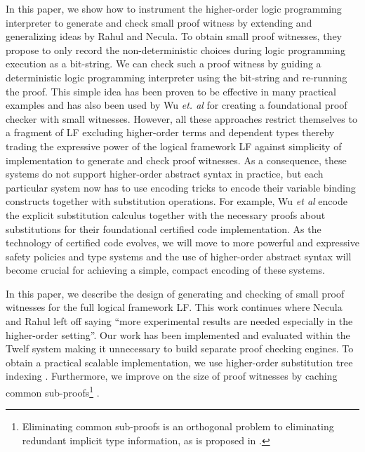 \documentclass{llncs}
\begin{document}
In this paper, we show how to instrument the higher-order logic
programming interpreter to generate and check small proof
witness by extending and generalizing ideas by Rahul and
Necula\cite{Necula+01:oracle}. To obtain small proof witnesses, they
propose to only record the non-deterministic choices during 
logic programming execution as a bit-string. We can check such a proof
witness by guiding a deterministic logic programming interpreter using the
bit-string and re-running the proof. This simple idea has
been proven to be effective in many practical examples and has also
been used by Wu {\em{et. al}} \cite{Appel:PPDP03} for creating a
foundational proof checker with small witnesses. However, all these
approaches restrict themselves to a fragment of LF excluding
higher-order terms and dependent types thereby trading the expressive
power of the logical framework LF against simplicity of implementation
to generate and check proof witnesses.  
As a consequence, these systems do not support higher-order abstract
syntax in practice, but each particular system now has to use
encoding tricks to encode their variable binding constructs together
with substitution operations. For example, Wu {\em et
  al}\cite{Appel:PPDP03} encode the explicit  substitution calculus
\cite{Abadi:POPL90} together with the necessary proofs about
substitutions for their foundational certified code implementation. As
the technology of certified code evolves, we will move to more
powerful and expressive safety policies and type systems and the use
of higher-order abstract syntax will become crucial for achieving a 
simple, compact encoding of these systems.


In this paper, we describe the design of generating and checking
of small proof witnesses for the full logical framework LF. This work
continues where Necula and Rahul \cite{Necula+01:oracle} left off 
saying ``more experimental results are needed especially in the
higher-order setting''. Our work has been implemented and evaluated
within the Twelf system \cite{Pfenning99cade} making it unnecessary to
build separate proof checking engines. To obtain a practical scalable
implementation, we use higher-order substitution tree  indexing
\cite{Pientka:ICLP03}. Furthermore, we improve on the size of proof
witnesses by caching common sub-proofs\footnote{Eliminating
  common sub-proofs is an orthogonal problem to eliminating redundant
  implicit type information, as is proposed in \cite{Necula98lics}.}
. 
\end{document}
